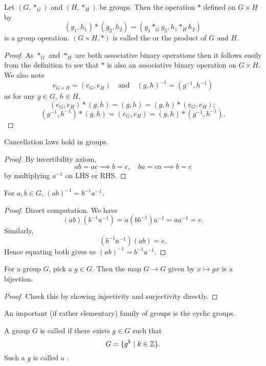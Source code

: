 \begin{definition}
Let $(G,\ast_G)$ and $(H,\ast_H)$ be groups. Then the operation $\ast$ defined on $G\times H$ by
\[ (g_1,h_1)\ast(g_2,h_2)=(g_1\ast_G g_2,h_1\ast_H h_2) \]
is a group operation. $(G \times H, \ast)$ is called the  or the product of $G$ and $H$.
\end{definition}
    
\begin{proof}
As $\ast_G$ and $\ast_H$ are both associative binary operations then it follows easily from the definition to see that $\ast$ is also an associative binary operation on $G \times H$. We also note
\[ e_{G\times H}=(e_G,e_H) \quad \text{and} \quad (g,h)^{-1}=(g^{-1},h^{-1}) \]
as for any $g \in G$, $h \in H$,
\[ (e_G,e_H)\ast(g,h)=(g,h)=(g,h)\ast(e_G,e_H); \]
\[ (g^{-1},h^{-1})\ast(g,h)=(e_G,e_H)=(g,h)\ast(g^{-1},h^{-1}). \]
\end{proof}

\begin{proposition}
Cancellation laws hold in groups.
\end{proposition}
\begin{proof}
By invertibility axiom,
\[ ab=ac \implies b=c,\quad ba=ca\implies b=c \]
by multiplying $a^{-1}$ on LHS or RHS. 
\end{proof}

\begin{proposition}
For $a,b \in G$, $(ab)^{-1} = b^{-1}a^{-1}$.
\end{proposition}
\begin{proof}
Direct computation. We have
\[ (ab)(b^{-1}a^{-1}) = a(bb^{-1})a^{-1} = aa^{-1} = e. \]
Similarly, 
\[ (b^{-1}a^{-1})(ab) = e. \]
Hence equating both gives us $(ab)^{-1} = b^{-1}a^{-1}$.
\end{proof}

\begin{proposition}
For a group $G$, pick a $g \in G$. Then the map $G \to G$ given by $x \mapsto gx$ is a bijection.
\end{proposition}
\begin{proof}
Check this by showing injectivity and surjectivity directly.
\end{proof}



An important (if rather elementary) family of groups is the cyclic groups.

\begin{definition}
A group $G$ is called  if there exists $g\in G$ such that
\[ G=\{g^k\mid k\in\mathbb Z\}. \]
Such a $g$ is called a .
\end{definition}

